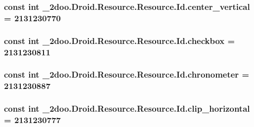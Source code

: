 \hypertarget{class__2doo_1_1_droid_1_1_resource_1_1_id_6a8b2b4ee5307e73f368876bc26d2ba2}{
\subsubsection[{center\_\-vertical}]{\setlength{\rightskip}{0pt plus 5cm}const int \_\-2doo.Droid.Resource.Resource.Id.center\_\-vertical = 2131230770}}
\label{class__2doo_1_1_droid_1_1_resource_1_1_id_6a8b2b4ee5307e73f368876bc26d2ba2}


\hypertarget{class__2doo_1_1_droid_1_1_resource_1_1_id_5621ef605c0ca1450cc1642b3637d49d}{
\subsubsection[{checkbox}]{\setlength{\rightskip}{0pt plus 5cm}const int \_\-2doo.Droid.Resource.Resource.Id.checkbox = 2131230811}}
\label{class__2doo_1_1_droid_1_1_resource_1_1_id_5621ef605c0ca1450cc1642b3637d49d}


\hypertarget{class__2doo_1_1_droid_1_1_resource_1_1_id_597f2c11928decbff8133b549d73bac4}{
\subsubsection[{chronometer}]{\setlength{\rightskip}{0pt plus 5cm}const int \_\-2doo.Droid.Resource.Resource.Id.chronometer = 2131230887}}
\label{class__2doo_1_1_droid_1_1_resource_1_1_id_597f2c11928decbff8133b549d73bac4}


\hypertarget{class__2doo_1_1_droid_1_1_resource_1_1_id_2a879e1f8fe59fcec5331e09238964cd}{
\subsubsection[{clip\_\-horizontal}]{\setlength{\rightskip}{0pt plus 5cm}const int \_\-2doo.Droid.Resource.Resource.Id.clip\_\-horizontal = 2131230777}}
\label{class__2doo_1_1_droid_1_1_resource_1_1_id_2a879e1f8fe59fcec5331e09238964cd}


